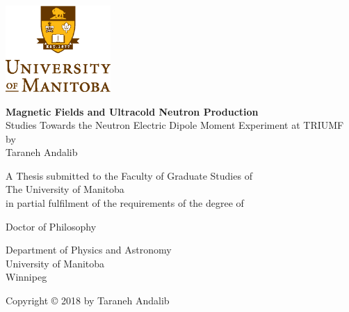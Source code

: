 \documentclass[12pt,a4paper]{book}
\begin{document}

\noindent
\begin{titlepage}
  \begin{center}
         \includegraphics[width=0.3\textwidth]{university.eps}\\
        \vspace*{1cm}
        
        \textbf{Magnetic Fields and Ultracold Neutron Production }
        \\
        Studies Towards the Neutron Electric Dipole Moment Experiment
        at TRIUMF
        \\
        by\\
        
        \vspace{1.0cm}
        Taraneh Andalib
        
        \vspace{2.0cm}
        A Thesis submitted to the Faculty of Graduate Studies of\\
        \vspace{0.5cm}
        The University of Manitoba\\
        \vspace{0.5cm}
        in partial fulfilment of the requirements of the degree of
        
        \vspace{1.5cm}
        
       
        Doctor of Philosophy\\
       \vspace{0.5cm}
        
   
        \vspace{0.5cm}
        Department of Physics and Astronomy\\
        University of Manitoba\\
        Winnipeg

        \vspace{3.0cm}
        Copyright © 2018 by Taraneh Andalib
        
    \end{center}
\end{titlepage}
\end{document}
